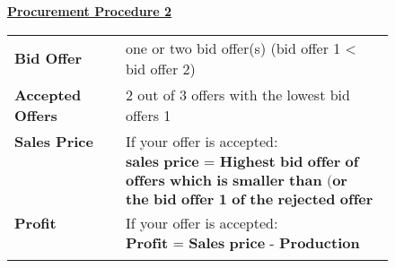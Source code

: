\documentclass[11pt]{article}
\begin{document}
{\begin{figure}[ht!]
\begin{minipage}[t]{1\linewidth}
\begin{tcolorbox}[arc=0pt,colframe=black!25]
			\textbf{\underline{Procurement Procedure 2}} ~\bigbreak

				\begin{tabular}{ll} \medbreak
					\textbf{Bid Offer} 				& one or two bid offer(s) (bid offer 1 < bid offer 2) \\ \medbreak
					\textbf{Accepted Offers} 		& 2 out of 3 offers with the lowest bid offers 1 \\ \medbreak
					\textbf{Sales Price} 			&  If your offer is accepted: \\ 
													& \hspace{0.8cm} $ \textbf{sales price = Highest bid offer of the two accepted}$ \\
													& \hspace{3.4cm} $ \textbf{offers which is smaller than (or equals)} $  \\ 
													& \hspace{3.4cm} $ \textbf{the bid offer 1 of the rejected offer} $  \\ 
					\textbf{Profit}					& If your offer is accepted: \\ 
													& \hspace{0.8cm} $\textbf{Profit = Sales price - Production cost}$ \\
					\hspace{3.75cm}					& 	   
				\end{tabular} 
 
		\end{tcolorbox} 
	\end{minipage}  
  \end{figure}
 \clearpage
 \restoregeometry
}

~\newpage


\end{document}
